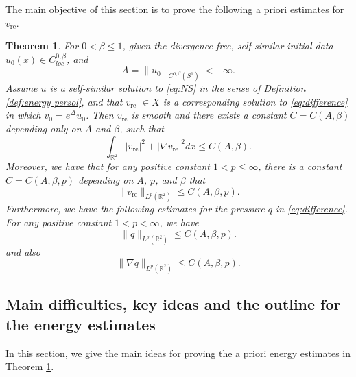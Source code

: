 \documentclass[12pt]{amsart}
\numberwithin{equation}{section}              %
\newtheorem{theorem}{Theorem}[section]
\theoremstyle{remark}
\begin{document}
	The main objective of this section is to prove the following a priori estimates for $v_{\text{re}}$.
	\begin{theorem}\label{thm:energyestkey}
		For $0<\beta\leq 1$, given the divergence-free, self-similar initial data $u_0(x)\in C^{0,\beta}_{loc}$, and
		\begin{equation*}
			A=\|u_0\|_{C^{0,\beta}(S^1)}<+\infty.
		\end{equation*}
		Assume $u$  is a self-similar solution to \eqref{eq:NS} in the sense of Definition \ref{def:energy persol},
		and that 
        $v_{\textrm{re}}$ $ \in X$ is a corresponding solution to
		\eqref{eq:difference} in which $v_0=e^{\Delta}u_0$. Then $v_{\text{re}}$ is smooth and
		there exists a constant $C=C(A,\beta)$ depending only on $A$ and $\beta$, such that
		\begin{equation}\label{eq:energyest}
			\int_{\mathbb{R}^2} |v_{\text{re}}|^2 + |\nabla v_{\text{re}}|^2 dx \leq C(A,\beta).
		\end{equation}
		Moreover,  we have that for any positive constant $1<p\leq \infty$, there is a constant  $C=C(A,\beta,p)$ depending  on $A$, $p$, and $\beta$ that 
		\begin{equation*}
			\|v_{\text{re}}\|_{L^{p}(\mathbb{R}^2)} \leq C(A,\beta,p).
		\end{equation*}
		Furthermore, we have the following estimates for the pressure $q$ in \eqref{eq:difference}. For any positive constant $1<p< \infty$, we have
		\begin{equation*}
			\|q\|_{L^{p}(\mathbb{R}^2)} \leq C(A,\beta,p). 
		\end{equation*}
		and
		also  
		\begin{equation*}
			\|\nabla q\|_{L^{p}(\mathbb{R}^2)} \leq C(A,\beta,p). 
		\end{equation*}
	\end{theorem}

	\subsection{Main difficulties, key ideas and the outline  for the energy estimates}\label{sec:outline}
	In this section, we give the main ideas for proving the a priori energy estimates  in Theorem  \ref{thm:energyestkey}.
	
\end{document}
